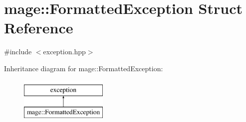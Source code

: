 \hypertarget{structmage_1_1_formatted_exception}{}\section{mage\+:\+:Formatted\+Exception Struct Reference}
\label{structmage_1_1_formatted_exception}


{\ttfamily \#include $<$exception.\+hpp$>$}

Inheritance diagram for mage\+:\+:Formatted\+Exception\+:\begin{figure}[H]
\begin{center}
\leavevmode
\includegraphics[height=2.000000cm]{structmage_1_1_formatted_exception}
\end{center}
\end{figure}
